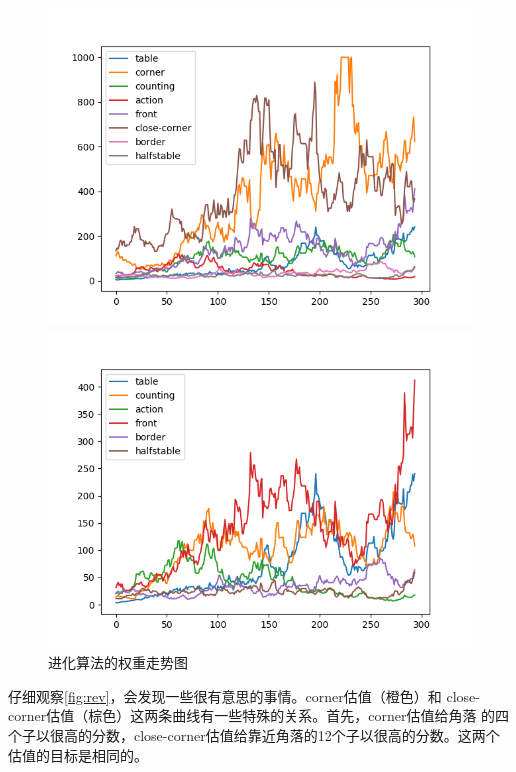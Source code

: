 \documentclass[a4paper]{article}
\begin{document}
\begin{figure}[!hbt]
\begin{minipage}{0.48\textwidth}
    \centering
    \includegraphics[width=\linewidth]{assets/all.png}
\end{minipage}\hfill
\begin{minipage}{0.48\textwidth}
    \centering
    \includegraphics[width=\linewidth]{assets/small.png}
\end{minipage}
\caption{进化算法的权重走势图} \label{fig:rev}
\end{figure}

仔细观察\autoref{fig:rev}，会发现一些很有意思的事情。corner估值（橙色）和
close-corner估值（棕色）这两条曲线有一些特殊的关系。首先，corner估值给角落
的四个子以很高的分数，close-corner估值给靠近角落的12个子以很高的分数。这两个
估值的目标是相同的。\\
\end{document}

